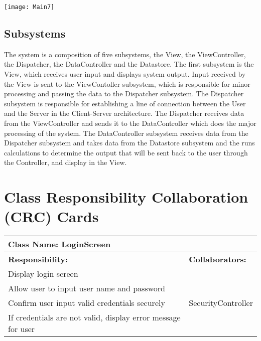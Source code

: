 \documentclass[english]{article}
\begin{document}
\texttt{[image: Main7]}

\subsection{Subsystems}
\label{sub:subsystems}
The system is a composition of five subsystems, the View, the ViewController, the Dispatcher, the DataController and the Datastore. The first subsystem is the View, which receives user input and displays system output. Input received by the View is sent to the ViewContoller subsystem, which is responsible for minor processing and passing the data to the Dispatcher subsystem. The Dispatcher subsystem is responsible for establishing a line of connection between the User and the Server in the Client-Server architecture. The Dispatcher receives data from the ViewController and sends it to the DataController which does the major processing of the system. The DataController subsystem receives data from the Dispatcher subsystem and takes data from the Datastore subsystem and the runs calculations to determine the output that will be sent back to the user through the Controller, and display in the View. 



    
\section{Class Responsibility Collaboration (CRC) Cards}
\label{sec:class_responsibility_collaboration_crc_cards}
    
    \begin{table}[!ht]
        \centering
        \begin{tabular}{|p{8cm}|p{4cm}|}
        \hline 
        \multicolumn{2}{|l|}{\textbf{Class Name: LoginScreen}} \\
        \hline
        \textbf{Responsibility:} & \textbf{Collaborators:} \\
        \hline
        Display login screen &  \\
        \hline
        Allow user to input user name and password & \\
        \hline
        Confirm user input valid credentials securely & SecurityController \\
        \hline
        If credentials are not valid, display error message for user & \\
        \hline
        \end{tabular}
    \end{table}
    
\end{document}
